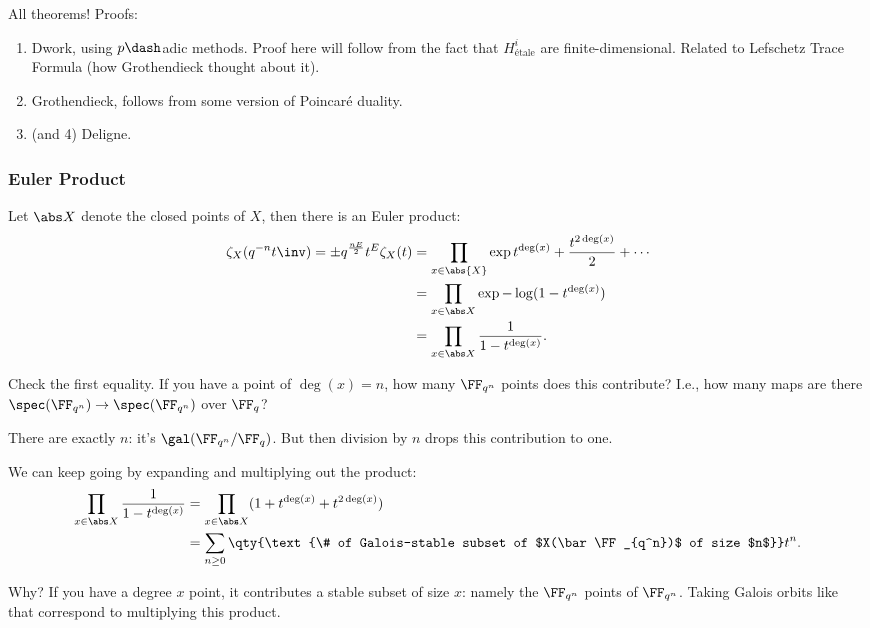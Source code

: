 All theorems! Proofs:

\begin{enumerate}
\def\labelenumi{\arabic{enumi}.}
\item
  Dwork, using \(p\dash\)adic methods. Proof here will follow from the
  fact that \(H^i_{\text{étale} }\) are finite-dimensional. Related to
  Lefschetz Trace Formula (how Grothendieck thought about it).
\item
  Grothendieck, follows from some version of Poincaré duality.
\item
  (and 4) Deligne.
\end{enumerate}

\hypertarget{euler-product}{%
\subsubsection{Euler Product}\label{euler-product}}

Let \(\abs X\) denote the closed points of \(X\), then there is an Euler
product:
\begin{align*}  
\zeta_X(q^{-n} t\inv) = \pm q^{nE \over 2} t^E \zeta_X(t)
&= \prod_{x\in \abs{X}} \exp{t^{\deg (x)} + {t^{2\deg (x)} \over 2} + \cdots} \\
&= \prod_{x\in \abs X} \exp{-\log(1-t^{\deg(x)})} \\
&= \prod_{x\in \abs X} {1 \over 1 - t^{\deg(x)}}
.\end{align*}

\begin{exercise}

Check the first equality. If you have a point of \(\deg(x) = n\), how
many \(\FF_{q^n}\) points does this contribute? I.e., how many maps are
there \(\spec(\FF_{q^n}) \to \spec(\FF_{q^n})\) over \(\FF_q\)?

There are exactly \(n\): it's \(\gal(\FF_{q^n} / \FF_q)\). But then
division by \(n\) drops this contribution to one.

\end{exercise}

We can keep going by expanding and multiplying out the product:
\begin{align*}  
\prod_{x\in \abs X} {1 \over 1 - t^{\deg(x)}}
&= \prod_{x\in \abs X} (1 + t^{\deg(x)} + t^{2 \deg(x)}) \\
&= \sum_{n\geq 0} \qty{\text{\# of Galois-stable subset of $X(\bar \FF_{q^n})$ of size $n$}}t^n
.\end{align*}

Why? If you have a degree \(x\) point, it contributes a stable subset of
size \(x\): namely the \(\FF_{q^n}\) points of \(\FF_{q^n}\). Taking
Galois orbits like that correspond to multiplying this product.

